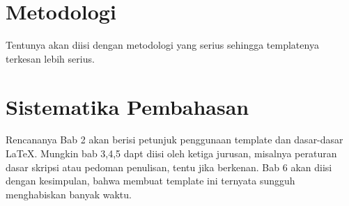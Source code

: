 
\section{Metodologi}
\label{sec:metlit}
Tentunya akan diisi dengan metodologi yang serius sehingga templatenya terkesan lebih serius.


\section{Sistematika Pembahasan}
\label{sec:sispem}
Rencananya Bab 2 akan berisi petunjuk penggunaan template dan dasar-dasar \LaTeX.
Mungkin bab 3,4,5 dapt diisi oleh ketiga jurusan, misalnya peraturan dasar skripsi atau pedoman penulisan, tentu jika berkenan.
Bab 6 akan diisi dengan kesimpulan, bahwa membuat template ini ternyata sungguh menghabiskan banyak waktu.

